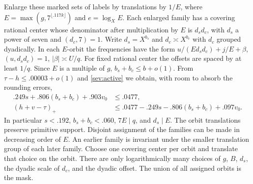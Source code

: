 \documentclass[11pt,a4paper]{article}
\theoremstyle{paperplain}
\numberwithin{equation}{section}
\begin{document}
Enlarge these marked sets of labels by translations by $1/E$, where
$E=\max(g,7^{\lfloor.117k\rfloor})$ and $e=\log_X E$. Each
enlarged family has a covering rational center whose denominator
after multiplication by $E$ is $d_s d_c$, with $d_s$ a power of
seven and $(d_c,7)=1$. Write $d_s=X^{b_s}$ and
$d_c\asymp X^{b_c}$ with $d_c$ grouped dyadically.
In each $E$-orbit the frequencies have the form
$u/(Ed_s d_c)+j/E+\beta$, $(u,d_s d_c)=1$,
$|\beta|\asymp U/q$. For fixed rational center the offsets are
spaced by at least $1/q$. Since $E$ is a multiple of $g$,
$b_s+b_c\le b+o(1)$. From $\tau-h\le .00003+o(1)$ and
\eqref{sev:active} we obtain, with room to absorb the rounding errors,
\begin{align}
 .249s+.806(b_s+b_c)+.903v_0&\le .0477,\label{sev:budget}\\
 (h+v-\tau)_+&\le .0477-.249s-.806(b_s+b_c)+.097v_0 .
 \label{sev:height}
\end{align}
In particular $s<.192$, $b_s+b_c<.060$, $7E\mid q$, and $d_s\mid E$.
The orbit translations preserve primitive support. Disjoint assignment
of the families can be made in decreasing order of $E$. An earlier
family is invariant under the smaller translation group of each later
family. Choose one covering center per orbit and translate that choice
on the orbit. There are only logarithmically many choices of $g$,
$B$, $d_s$, the dyadic scale of $d_c$, and the dyadic offset.
The union of all assigned orbits is the mask.
\end{document}
